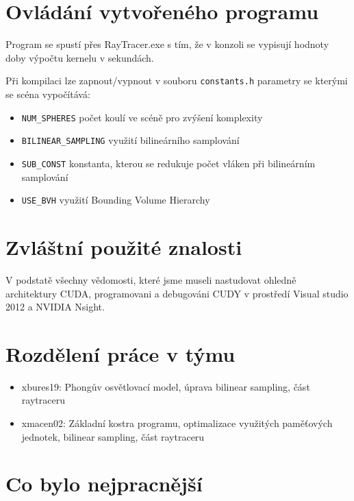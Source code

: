\documentclass[12pt,a4paper,titlepage,final]{report}
\begin{document}
\section{Ovládání vytvořeného programu}

Program se spustí přes RayTracer.exe s tím, že v konzoli se vypisují hodnoty doby výpočtu kernelu v sekundách.

Při kompilaci lze zapnout/vypnout v souboru \verb|constants.h| parametry se kterými se scéna vypočítává:
\begin{itemize}
	\item \verb|NUM_SPHERES| počet koulí ve scéně pro zvýšení komplexity
	\item \verb|BILINEAR_SAMPLING| využití bilineárního samplování
	\item \verb|SUB_CONST| konstanta, kterou se redukuje počet vláken při bilineárním samplování
	\item \verb|USE_BVH| využití Bounding Volume Hierarchy
\end{itemize}

\section{Zvláštní použité znalosti}

V podstatě všechny vědomosti, které jsme museli nastudovat ohledně architektury CUDA, programovani a debugováni CUDY v prostředí Visual studio 2012 a NVIDIA Nsight.

\section{Rozdělení práce v týmu}

\begin{itemize}
\item xbures19: Phongův osvětlovací model, úprava bilinear sampling, část raytraceru 
\item xmacen02: Základní kostra programu, optimalizace využitých paměťových jednotek, bilinear sampling, část raytraceru 
\end{itemize}

\section{Co bylo nejpracnější}
\end{document}
